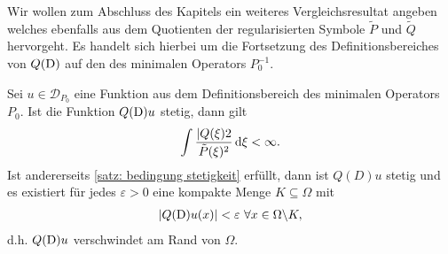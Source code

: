 Wir wollen zum Abschluss des Kapitels ein weiteres Vergleichsresultat angeben welches ebenfalls aus dem Quotienten der regularisierten Symbole $\tilde{P}$ und $ \tilde{Q}$ hervorgeht. Es handelt sich hierbei um die Fortsetzung des Definitionsbereiches von $Q(\mathrm D)$ auf den des minimalen Operators $P_0^{-1}$.
\begin{thm}
Sei $u \in \mathcal{D}_{P_0}$ eine Funktion aus dem Definitionsbereich des minimalen Operators $P_0$. Ist die Funktion $Q(\mathrm D)u$ stetig, dann gilt
\begin{equation}\label{satz: bedingung stetigkeit}
\int \frac{|Q(\xi)2}{\tilde{P}(\xi)^2} \,\mathrm d \xi < \infty.
\end{equation}
Ist andererseits \eqref{satz: bedingung stetigkeit} erfüllt, dann ist $Q(D)u$ stetig und es existiert für jedes $\varepsilon >0$ eine kompakte Menge $K \subseteq \Omega$ mit
\begin{align*}
|Q(\mathrm D)u(x)| < \varepsilon \ \forall x \in \Omega \backslash K,
\end{align*}
d.h. $Q(\mathrm D)u$ verschwindet am Rand von $\Omega$.
\end{thm}
